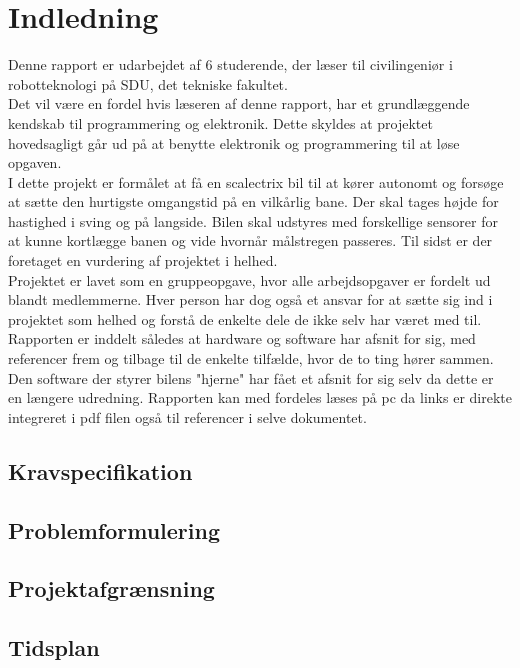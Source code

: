 \section{Indledning}

Denne rapport er udarbejdet af 6 studerende, der læser til civilingeniør i robotteknologi på SDU, det tekniske fakultet.\\

Det vil være en fordel hvis læseren af denne rapport, har et grundlæggende kendskab til programmering og elektronik. Dette skyldes at projektet hovedsagligt går ud på at benytte elektronik og programmering til at løse opgaven.\\
I dette projekt er formålet at få en scalectrix bil til at kører autonomt og forsøge at sætte den hurtigste omgangstid på en vilkårlig bane. Der skal tages højde for hastighed i sving og på langside. Bilen skal udstyres med forskellige sensorer for at kunne kortlægge banen og vide hvornår målstregen passeres. Til sidst er der foretaget en vurdering af projektet i helhed.\\
Projektet er lavet som en gruppeopgave, hvor alle arbejdsopgaver er fordelt ud blandt medlemmerne. Hver person har dog også et ansvar for at sætte sig ind i projektet som helhed og forstå de enkelte dele de ikke selv har været med til. Rapporten er inddelt således at hardware og software har afsnit for sig, med referencer frem og tilbage til de enkelte tilfælde, hvor de to ting hører sammen. Den software der styrer bilens "hjerne" har fået et afsnit for sig selv da dette er en længere udredning. Rapporten kan med fordeles læses på pc da links er direkte integreret i pdf filen også til referencer i selve dokumentet.

\subsection{Kravspecifikation}

\subsection{Problemformulering}

\subsection{Projektafgrænsning}

\subsection{Tidsplan}